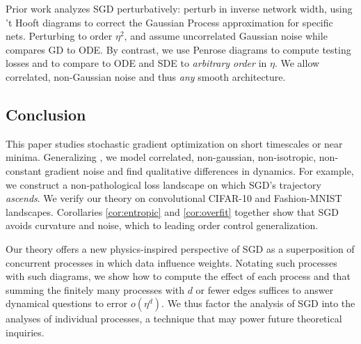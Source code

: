         
            Prior work analyzes SGD perturbatively: \cite{dy19} perturb in
            inverse network width, using 't Hooft diagrams to correct the
            Gaussian Process approximation for specific nets.  Perturbing
            to order $\eta^2$, \cite{ch18} and \cite{li17} assume uncorrelated
            Gaussian noise while \cite{ba21} compares GD to ODE.
            By contrast, we use Penrose diagrams \cite{pe71} to compute
            testing losses and to compare to ODE and SDE to \emph{arbitrary
            order} in $\eta$.  
            We allow correlated,
            non-Gaussian noise and thus \emph{any} smooth architecture.


\subsection{Conclusion}


            This paper
            studies stochastic gradient optimization on short timescales
            or near minima. 
Generalizing \cite{li18,we19b,zh19,ba21}, we model correlated, non-gaussian,
non-isotropic, non-constant gradient noise and find qualitative differences in
dynamics.  For example, we construct a non-pathological loss landscape on which
SGD's trajectory \emph{ascends}.  We verify our theory on convolutional
CIFAR-10 and Fashion-MNIST landscapes.
            Corollaries \ref{cor:entropic} and
            \ref{cor:overfit} together show that SGD avoids curvature and
            noise, which to leading order control generalization.


    Our theory offers a new physics-inspired perspective of SGD as a
    superposition of concurrent processes in which data influence weights.
    Notating such processes with such diagrams, we show how to compute the
    effect of each process and that summing the finitely many processes with
    $d$ or fewer edges suffices to answer dynamical questions to error
    $o(\eta^d)$.  We thus factor the analysis of SGD into the analyses of
    individual processes, a technique that may power future theoretical
    inquiries.  



